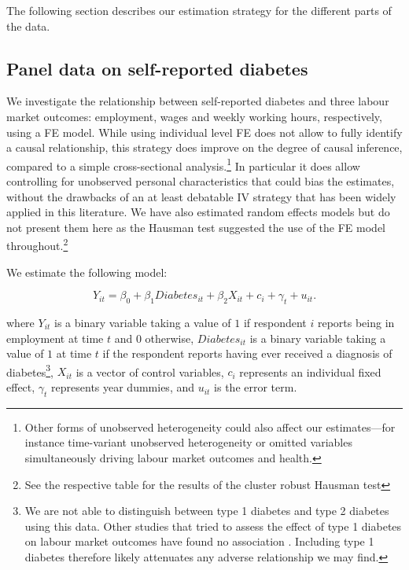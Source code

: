 The following section describes our estimation strategy for the different parts of the data.


\subsection{Panel data on self-reported diabetes}

We investigate the relationship between self-reported diabetes and three
labour market outcomes: employment, wages and weekly working hours, respectively, using a \ac{FE} model. While using individual level \ac{FE} does not allow to fully identify a causal relationship, this strategy does improve on the degree of causal inference, compared to a simple cross-sectional analysis.\footnote{Other forms of unobserved heterogeneity could also affect our estimates---for instance time-variant unobserved heterogeneity or omitted variables simultaneously driving labour market outcomes and health.} In particular it does allow controlling for unobserved personal characteristics that could bias the estimates, without the drawbacks of an at least debatable \ac{IV} strategy that has been widely applied in this literature. We have also estimated random effects models but do not present them here as the Hausman test suggested the use of the \ac{FE} model throughout.\footnote{See the respective table for the results of the cluster robust Hausman test}


We estimate the following model:

\noindent 
\begin{equation}
Y_{it}=\beta_{0}+\beta_{1}Diabetes_{it}+\beta_{2}X_{it}+c_{i}+\gamma_{t}+u_{it}.\label{eq:cha4_employed}
\end{equation}


where $Y_{it}$ is a binary variable taking a value of $1$ if respondent $i$ reports being in employment at time $t$ and $0$ otherwise, $Diabetes_{it}$ is a binary variable taking a value of $1$ at time $t$ if the respondent reports having ever received a diagnosis of diabetes\footnote{We are not able to distinguish between type 1 diabetes and type 2 diabetes using this data. Other studies that tried to assess the effect of type 1 diabetes on labour market outcomes have found no association \parencite{Minor2011,Minor2015}. Including type 1 diabetes therefore likely attenuates any adverse relationship we may find.}, $X_{it}$ is a vector of control variables, $c_{i}$ represents an individual fixed effect, $\gamma_{t}$ represents year dummies, and $u_{it}$ is the error term.

